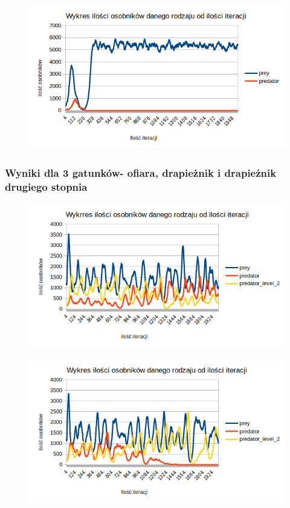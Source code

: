 \begin{figure}[!htb]
	\centering
	\includegraphics[width=1.1\linewidth]{img/samprey1}
	\caption{\label{fig:screen} }
\end{figure}

\subsubsection{Wyniki dla 3 gatunków- ofiara, drapieżnik i drapieżnik drugiego stopnia}


\begin{figure}[!htb]
	\centering
	\includegraphics[width=1.1\linewidth]{img/ok3}
	\caption{\label{fig:screen} }
\end{figure}
\begin{figure}[!htb]
	\centering
	\includegraphics[width=1.1\linewidth]{img/ok4}
	\caption{\label{fig:screen} }
\end{figure}

